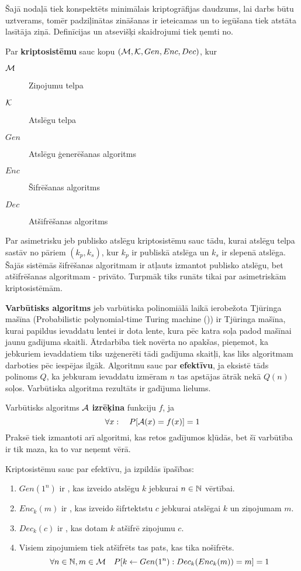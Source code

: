 Šajā nodaļā tiek konspektēts minimālais kriptogrāfijas daudzums, lai darbs būtu uztverams, tomēr padziļinātas zināšanas ir ieteicamas un to iegūšana tiek atstāta lasītāja ziņā. Definīcijas un atsevišķi skaidrojumi tiek ņemti no\cite{pass10}.

Par \textbf{kriptosistēmu} sauc kopu $(\mathcal{M}, \mathcal{K}, Gen, Enc, Dec)$, kur
\begin{description}
    \item[$\mathcal{M}$]Ziņojumu telpa
    \item[$\mathcal{K}$]Atslēgu telpa
    \item[$Gen$]Atslēgu ģenerēšanas algoritms
    \item[$Enc$]Šifrēšanas algoritms
    \item[$Dec$]Atšifrēšanas algoritms
\end{description}

Par asimetrisku jeb publisko atslēgu kriptosistēmu sauc tādu, kurai atslēgu telpa sastāv no pāriem $(k_p, k_s)$, kur $k_p$ ir publiskā atslēga un $k_s$ ir slepenā atslēga. Šajās sistēmās šifrēšanas algoritmam ir atļauts izmantot publisko atslēgu, bet atšifrēšanas algoritmam - privāto. Turpmāk tiks runāts tikai par asimetriskām kriptosistēmām.

\textbf{Varbūtisks algoritms} jeb varbūtiska polinomiālā laikā ierobežota Tjūringa mašīna (Probabilistic polynomial-time Turing machine (\ppt)) ir Tjūringa mašīna, kurai papildus ievaddatu lentei ir dota lente, kura pēc katra soļa padod mašīnai jaunu gadījuma skaitli. Ātrdarbība tiek novērta no apakšas, pieņemot, ka jebkuriem ievaddatiem tiks uzģenerēti tādi gadījuma skaitļi, kas liks algoritmam darboties pēc iespējas ilgāk. Algoritmu sauc par \textbf{efektīvu}, ja eksistē tāds polinoms $Q$, ka jebkuram ievaddatu izmēram $n$ tas apstājas ātrāk nekā $Q(n)$ soļos. Varbūtiska algoritma rezultāts ir gadījuma lielums.

Varbūtisks algoritms $\mathcal{A}$ \textbf{izrēķina} funkciju $f$, ja
$$ \forall x : \quad P[\mathcal{A}(x) = f(x)] = 1 $$
Praksē tiek izmantoti arī algoritmi, kas retos gadījumos kļūdās, bet šī varbūtība ir tik maza, ka to var neņemt vērā.

Kriptosistēmu sauc par efektīvu, ja izpildās īpašības:
\begin{enumerate}
    \item $Gen(1^n)$ ir \ppt, kas izveido atslēgu $k$ jebkurai $n\in\mathbb{N}$ vērtībai.
    \item $Enc_k(m)$ ir \ppt, kas izveido šifrtektstu $c$ jebkurai atslēgai $k$ un ziņojumam $m$.
    \item $Dec_k(c)$ ir \ppt, kas dotam $k$ atšifrē ziņojumu $c$.
    \item Visiem ziņojumiem tiek atšifrēts tas pats, kas tika nošifrēts.
        $$ \forall n\in\mathbb{N}, m\in\mathcal{M} \quad P[k\leftarrow Gen(1^n): Dec_k(Enc_k(m)) = m] = 1 $$
\end{enumerate}


